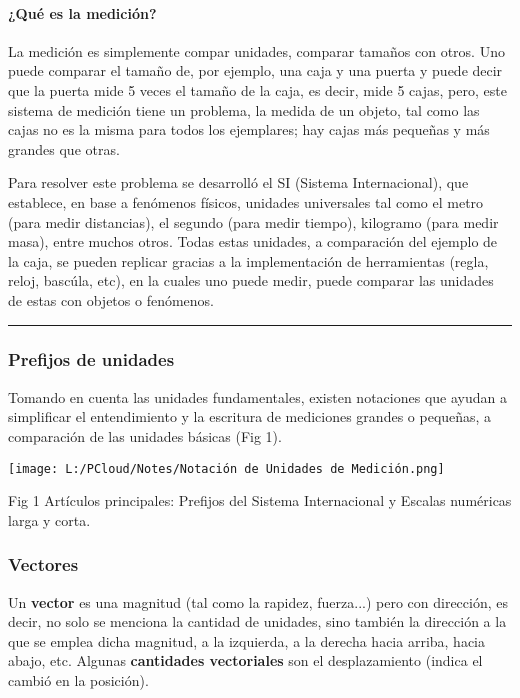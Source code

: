 \documentclass[
]{article}
\begin{document}
\hypertarget{quuxe9-es-la-mediciuxf3n}{%
\paragraph{¿Qué es la medición?}\label{quuxe9-es-la-mediciuxf3n}}

La medición es simplemente compar unidades, comparar tamaños con otros.
Uno puede comparar el tamaño de, por ejemplo, una caja y una puerta y
puede decir que la puerta mide 5 veces el tamaño de la caja, es decir,
mide 5 cajas, pero, este sistema de medición tiene un problema, la
medida de un objeto, tal como las cajas no es la misma para todos los
ejemplares; hay cajas más pequeñas y más grandes que otras.

Para resolver este problema se desarrolló el SI (Sistema Internacional),
que establece, en base a fenómenos físicos, unidades universales tal
como el metro (para medir distancias), el segundo (para medir tiempo),
kilogramo (para medir masa), entre muchos otros. Todas estas unidades, a
comparación del ejemplo de la caja, se pueden replicar gracias a la
implementación de herramientas (regla, reloj, bascúla, etc), en la
cuales uno puede medir, puede comparar las unidades de estas con objetos
o fenómenos.

\begin{center}\rule{0.5\linewidth}{0.5pt}\end{center}

\hypertarget{prefijos-de-unidades}{%
\subsubsection{Prefijos de unidades}\label{prefijos-de-unidades}}

Tomando en cuenta las unidades fundamentales, existen notaciones que
ayudan a simplificar el entendimiento y la escritura de mediciones
grandes o pequeñas, a comparación de las unidades básicas (Fig 1).

\texttt{[image: L:/PCloud/Notes/Notación de Unidades de Medición.png]}

Fig 1 Artículos principales: Prefijos del Sistema Internacional y
Escalas numéricas larga y corta.

\hypertarget{vectores}{%
\subsubsection{Vectores}\label{vectores}}

Un \textbf{vector} es una magnitud (tal como la rapidez, fuerza...) pero
con dirección, es decir, no solo se menciona la cantidad de unidades,
sino también la dirección a la que se emplea dicha magnitud, a la
izquierda, a la derecha hacia arriba, hacia abajo, etc. Algunas
\textbf{cantidades vectoriales} son el desplazamiento (indica el cambió
en la posición).
\end{document}
